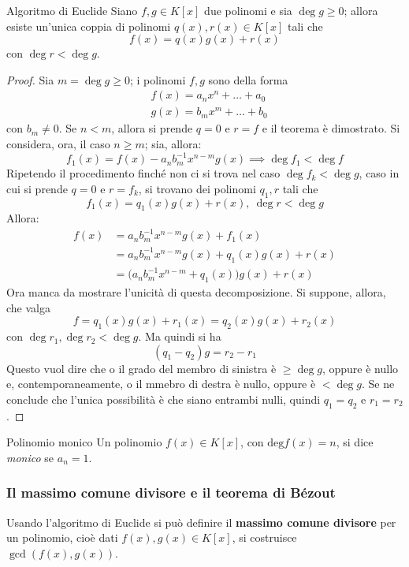 \documentclass[11pt, a4paper]{scrartcl}
\theoremstyle{definition}
\numberwithin{esempio}{section}
\theoremstyle{definition}
\numberwithin{obs}{section}
\numberwithin{nota}{section}
\numberwithin{equation}{subsection}
\begin{document}
\begin{teorema}
	{Algoritmo di Euclide}{}
	Siano $f,g \in K[x]$ due polinomi e sia $\operatorname{deg} g \ge  0$; allora esiste un'unica coppia di polinomi $q(x),r(x) \in K[x]$ tali che
	\[
	f(x) = q(x) g(x) + r(x)
	\] 
	con $\operatorname{deg} r < \operatorname{deg} g$.
	\begin{proof}
		Sia $m = \operatorname{deg} g \ge 0$; i polinomi $f,g$ sono della forma
		\[
		\begin{split}
			&f(x) = a_nx^n + \ldots + a_0\\
			&g(x) = b_m x^m + \ldots + b_0
		\end{split}
		\] 
		con $b_m\neq 0 $.
		Se $n < m$, allora si prende $q = 0$ e $r = f$ e il teorema \`e dimostrato.
		Si considera, ora, il caso $n\ge  m$; sia, allora:
		\[
		f_1(x) = f(x) - a_n b_m^{-1} x^{n-m} g(x)\implies \operatorname{deg} f_1 < \operatorname{deg} f
		\] 
		Ripetendo il procedimento finch\'e non ci si trova nel caso $\operatorname{deg} f_k < \operatorname{deg} g$, caso in cui si prende $q=0 $ e $r=f_k$, si trovano dei polinomi $q_1, r$ tali che
		\[
		f_1(x) = q_1(x) g(x) + r(x), \ \operatorname{deg} r < \operatorname{deg} g
		\] 
		Allora:
		\[
		\begin{split}
			f(x)&=a_nb_m^{-1} x^{n-m} g(x) + f_1(x)\\
			    &=a_nb_m^{-1} x^{n-m} g(x) + q_1(x)g(x) + r(x)\\
			    &=\big(a_nb_m^{-1} x^{n-m} +q_1(x)\big)g(x) + r(x)
		\end{split}
		\] 
		Ora manca da mostrare l'unicit\`a di questa decomposizione.
		Si suppone, allora, che valga
		\[
		f = q_1 (x) g(x) + r_1(x) = q_2 (x) g(x) + r_2(x)
		\] 
		con $\operatorname{deg} r_1, \operatorname{deg} r_2 < \operatorname{deg} g$.
		Ma quindi si ha 
		\[
			(q_1-q_2)g  = r_2-r_1
		\] 
		Questo vuol dire che o il grado del membro di sinistra \`e $\ge \operatorname{deg} g$, oppure \`e nullo e, contemporaneamente, o il mmebro di destra \`e nullo, oppure \`e $< \operatorname{deg} g$.
		Se ne conclude che l'unica possibilit\`a \`e che siano entrambi nulli, quindi $q_1=q_2$ e $r_1=r_2$.
	\end{proof}
\end{teorema}
\begin{definizione}
	{Polinomio monico}{}
	Un polinomio $f(x) \in K[x]$, con $\mathrm{deg} f(x) = n$, si dice \textit{monico} se $a_n = 1$.
\end{definizione}
\subsubsection{Il massimo comune divisore e il teorema di B\'ezout}
Usando l'algoritmo di Euclide si pu\`o definire il \textbf{massimo comune divisore} per un polinomio, cio\`e dati $f(x),g(x) \in K[x]$, si costruisce $\operatorname{gcd}(f(x),g(x)) $.
\end{document}

